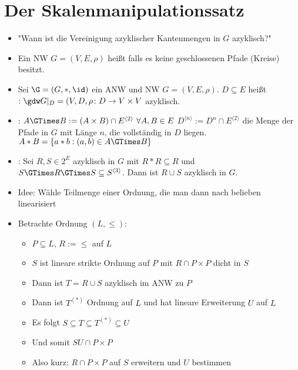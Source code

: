 	\section{Der Skalenmanipulationssatz}
	\begin{itemize}
		\item "Wann ist die Vereinigung azyklischer Kantenmengen in $G$ azyklisch?"	
		\item Ein NW $G=(V,E,\rho)$ heißt  falls es keine geschlossenen Pfade (Kreise) besitzt.
		\item Sei $\G=(G,\ast,\id)$ ein ANW und NW $G=(V,E,\rho)$. 
		$D\subseteq E$ heißt  $:\gdw G|_D=(V,D,\rho\colon D\to V\times V$ azyklisch.
		\item {}:
		$A\GTimes B:=(A\times B)\cap E^{\langle2\rangle}~\forall A,B\in E$
		$D^{\langle n\rangle}:=D^n\cap E^{\langle2\rangle}$ die Menge der Pfade in $G$ mit Länge $n$, die vollständig in $D$ liegen.		
		$A\ast B=\lbrace a\ast b:(a,b)\in A\GTimes B \rbrace$
		
		
		
		\item {}:
		Sei $R,S\in 2^E$ azyklisch in $G$ mit $R\ast R\subseteq R$ und $S\GTimes R\GTimes S\subseteq S^{\langle3\rangle}$.
	    Dann ist $R\cup S$ azyklisch in $G$.
	    \item Idee: Wähle Teilmenge einer Ordnung, die man dann nach belieben
            linearisiert
        \item Betrachte Ordnung $(L, \leq)$:
        \begin{itemize}
        	\item $P\subseteq L$, $R:=\leq$ auf $L$
        	\item $S$ ist lineare strikte Ordnung auf $P$ mit $R\cap P\times P$ dicht in $S$
        	\item Dann ist $T=R\cup S$ azyklisch im ANW zu $P$
        	\item Dann ist $T^{(\ast)}$ Ordnung auf $L$ und hat lineare Erweiterung $U$ auf $L$
        	\item Es folgt $S\subseteq T\subseteq T^{(\ast)}\subseteq U$
        	\item Und somit $SU\cap P\times P$
        	\item Also kurz: $R\cap P\times P$ auf $S$ erweitern und $U$ bestimmen
        \end{itemize}
	\end{itemize}
	
